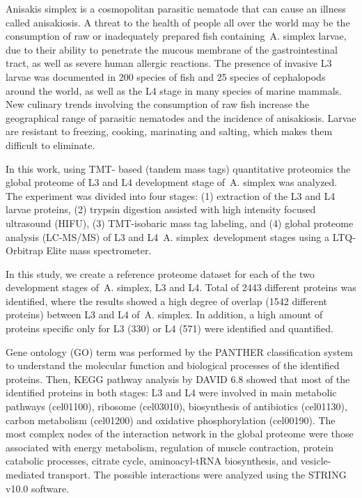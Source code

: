 {Anisakis simplex is a cosmopolitan parasitic nematode that can cause an illness called anisakiosis. A threat to the health of people all over the world may be the consumption of raw or inadequately prepared fish containing A. simplex larvae, due to their ability to penetrate the mucous membrane of the gastrointestinal tract, as well as severe human allergic reactions. The presence of invasive L3 larvae was documented in 200 species of fish and 25 species of cephalopods around the world, as well as the L4 stage in many species of marine mammals. New culinary trends involving the consumption of raw fish increase the geographical range of parasitic nematodes and the incidence of anisakiosis. Larvae are resistant to freezing, cooking, marinating and salting, which makes them difficult to eliminate.

In this work, using TMT- based (tandem mass tags) quantitative proteomics the global proteome of L3 and L4 development stage of A. simplex was analyzed. The experiment was divided into four stages: (1) extraction of the L3 and L4 larvae proteins, (2) trypsin digestion assisted with high intensity focused ultrasound (HIFU), (3) TMT-isobaric mass tag labeling, and (4) global proteome analysis (LC-MS/MS) of L3 and L4 A. simplex development stages using a LTQ-Orbitrap Elite mass spectrometer.

In this study, we create a reference proteome dataset for each of the two development stages of A. simplex, L3 and L4. Total of 2443 different proteins was identified, where the results showed a high degree of overlap (1542 different proteins) between L3 and L4 of A. simplex. In addition, a high amount of proteins specific only for L3 (330) or L4 (571) were identified and quantified.

Gene ontology (GO) term was performed by the PANTHER classification system to understand the molecular function and biological processes of the identified proteins. Then, KEGG pathway analysis by DAVID 6.8 showed that most of the identified proteins in both stages: L3 and L4 were involved in main metabolic pathways (cel01100), ribosome (cel03010), biosynthesis of antibiotics (cel01130), carbon metabolism (cel01200) and oxidative phosphorylation (cel00190). The most complex nodes of the interaction network in the global proteome were those associated with energy metabolism, regulation of muscle contraction, protein catabolic processes, citrate cycle, aminoacyl-tRNA biosynthesis, and vesicle-mediated transport. The possible interactions were analyzed using the STRING v10.0 software.

}
